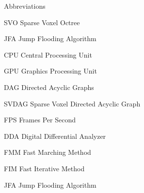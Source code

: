 \begin{dictionary}{Abbreviations}
    \item[SVO] Sparse Voxel Octree
    \item[JFA] Jump Flooding Algorithm
    \item[CPU] Central Processing Unit
    \item[GPU] Graphics Processing Unit
    \item[DAG] Directed Acyclic Graphs
    \item[SVDAG] Sparse Voxel Directed Acyclic Graph
    \item[FPS] Frames Per Second
    \item[DDA] Digital Differential Analyzer
    \item[FMM] Fast Marching Method
    \item[FIM] Fast Iterative Method
    \item[JFA] Jump Flooding Algorithm
\end{dictionary}
